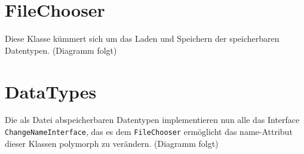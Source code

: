 \documentclass[a4paper]{scrreprt}
\begin{document}
\section{FileChooser}
Diese Klasse kümmert sich um das Laden und Speichern der speicherbaren Datentypen.
\newline
(Diagramm folgt)
\newline

\section{DataTypes}
Die als Datei abspeicherbaren Datentypen implementieren nun alle das Interface \verb!ChangeNameInterface!, das es dem \verb!FileChooser! ermöglicht das name-Attribut dieser Klassen polymorph zu verändern.
\newline
(Diagramm folgt)
\newline
\end{document}
